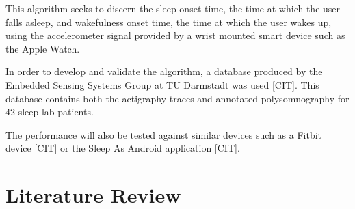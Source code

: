             This algorithm seeks to discern the sleep onset time, the time at which the user falls asleep, and wakefulness onset time, the time at which the user wakes up, using the accelerometer signal provided by a wrist mounted smart device such as the Apple Watch.

            In order to develop and validate the algorithm, a database produced by the Embedded Sensing Systems Group at TU Darmstadt was used [CIT]. This database contains both the actigraphy traces and annotated polysomnography for 42 sleep lab patients.

            The performance will also be tested against similar devices such as a Fitbit device [CIT] or the Sleep As Android application [CIT]. 


    \chapter{Literature Review}